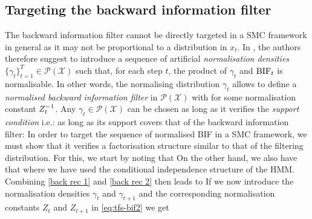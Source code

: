 \subsection{Targeting the backward information filter}
The backward information filter cannot be directly targeted in a SMC framework in general as it may not be proportional to a distribution in $x_{t}$. 
In \citet{briers10}, the authors therefore suggest to introduce a sequence of artificial \emph{normalisation densities} $\{\gamma_{t}\}_{t=1}^{T}\in\mathcal P(\mathcal X)$ such that, for each step $t$, the product of $\gamma_{t}$ and $\text{BIF}_{t}$ is normalisable. 
In other words, the normalising distribution $\gamma_{t}$ allows to define a \emph{normalised backward information filter} in $\mathcal P(\mathcal X)$ with
%
%
for some normalisation constant $Z^{-1}_{t}$.
Any $\gamma_{t}\in\mathcal P(\mathcal X)$ can be chosen as long as it verifies the \emph{support condition} i.e.: as long as its support covers that of the backward information filter:
%
%
In order to target the sequence of normalised BIF in a SMC framework, we must show that it verifies a factorisation structure similar to that of the filtering distribution. For this, we start by noting that
%
%
On the other hand, we also have that
%
%
where we have used the conditional independence structure of the HMM. 
Combining \eqref{back rec 1} and \eqref{back rec 2} then leads to
%
%
If we now introduce the normalisation densities $\gamma_{t}$ and $\gamma_{t+1}$ and the corresponding normalisation constants $Z_{t}$ and $Z_{t+1}$ in \eqref{eq:tfs-bif2} we get
%

